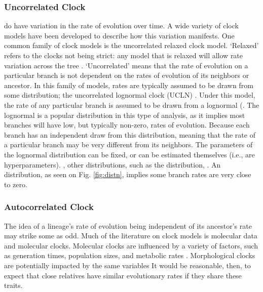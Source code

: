 \subsubsection{Uncorrelated Clock}
 do have variation in the rate of evolution over time.
A wide variety of clock models have been developed to describe how this variation manifests.
One common family of clock models is the uncorrelated relaxed clock model.
`Relaxed' refers to the clocks not being strict: any model that is relaxed will allow rate variation across the tree \citep{Drummond2006, Drummond2007}.
`Uncorrelated' means that the rate of evolution on a particular branch is not dependent on the rates of evolution of its neighbors or ancestor.
In this family of models, rates are typically assumed to be drawn from some distribution;
the uncorrelated lognormal clock (UCLN) .
Under this model, the rate of any particular branch is assumed to be drawn from a lognormal  (.
The lognormal is a popular distribution in this type of analysis, as it implies most branches will have low, but typically non-zero, rates of evolution.
Because each branch has an independent draw from this distribution, meaning that the rate of a particular branch may be very different from its neighbors.
The parameters of the lognormal distribution can be fixed, or can be estimated themselves (i.e., are hyperparameters).
, other distributions, such as the  distribution, .
An  distribution, as seen on Fig. \ref{fig:distn}, implies some branch rates are very close to zero.



\subsubsection{Autocorrelated Clock}
The idea of %
a lineage's rate of evolution being independent of its ancestor's rate may strike some as odd.
Much of the literature on clock models is  molecular data and molecular clocks.
Molecular clocks are influenced by a variety of factors, such as generation times, population sizes, and metabolic rates \citep{bromham1996, gaut1992}.
Morphological clocks are potentially impacted by the same variables %
It would be reasonable, then, to expect that close relatives have similar evolutionary rates if they share these traits.

